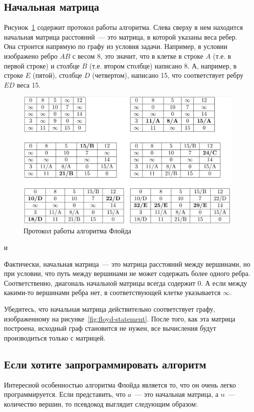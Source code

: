 \documentclass{article}
\begin{document}
\subsection{Начальная матрица}
Рисунок~\ref{fig:floyd-answer} содержит протокол работы алгоритма. Слева сверху в нем находится начальная матрица расстояний~--- это матрица, в которой указаны веса ребер. Она строится напрямую по графу из условия задачи. Например, в условии изображено ребро $AB$ с весом 8, это значит, что в клетке в строке $A$ (т.е. в первой строке) и столбце $B$ (т.е. втором столбце) написано 8.
А, например, в строке $E$ (пятой), столбце $D$ (четвертом), написано 15, что соответствует ребру $ED$ веса 15.

\begin{figure}
	\begin{center}
		\includegraphics[width=\textwidth]{floyd-answer.png}
	\end{center}
	\caption{Протокол работы алгоритма Флойда}
	\label{fig:floyd-answer}
\end{figure}и

Фактически, начальная матрица~--- это матрица расстояний между вершинами, но при условии, что путь между вершинами не может содержать более одного ребра.
Соответственно, диагональ начальной матрицы всегда содержит 0. А если между какими-то вершинами ребра нет, в соответствующей клетке указывается $\infty$.

Убедитесь, что начальная матрица действительно соответствует графу, изображенному на рисунке~\ref{fig:floyd-statement}. После того, как эта матрица построена, исходный граф становится не нужен, все вычисления будут производиться только с матрицей.

\subsection{Если хотите запрограммировать алгоритм}
Интересной особенностью алгоритма Флойда является то, что он очень легко программируется. Если представить, что $a$~--- это начальная матрица, а $n$~--- количество вершин, то псевдокод выглядит следующим образом:
\end{document}
